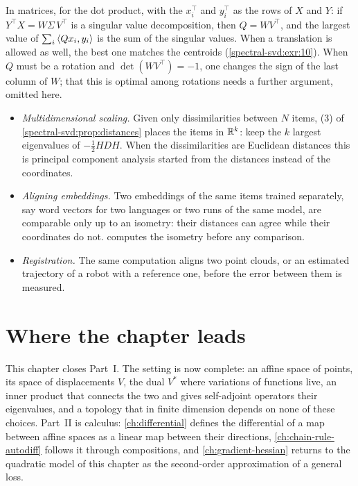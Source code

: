 \begin{notechapter}
In matrices, for the dot product, with the $x_i^\top$ and $y_i^\top$ as
the rows of $X$ and
$Y$: if $Y^\top X = W\Sigma\,V^\top$ is a singular value decomposition,
then $Q = WV^\top$, and the largest value of
$\sum_i\left\langle Qx_i, y_i \right\rangle$ is the sum of the singular values. When a
translation is allowed as well, the best one matches the centroids
(\cref{spectral-svd:exr:10}). When $Q$ must be a rotation and
$\det(WV^\top) = -1$, one changes the sign of the last column of $W$;
that this is optimal among rotations needs a further argument, omitted
here.

\begin{mlthread}
\begin{itemize}[nosep]
  \item \emph{Multidimensional scaling.} Given only dissimilarities
        between $N$ items, (3) of
        \cref{spectral-svd:prop:distances} places the items in $\mathbb{R}^k$:
        keep the $k$ largest eigenvalues of $-\frac12HDH$. When the
        dissimilarities are Euclidean distances this is principal
        component analysis started from the distances instead of the
        coordinates.
  \item \emph{Aligning embeddings.} Two embeddings of the same items
        trained separately, say word vectors for two languages or two
        runs of the same model, are comparable only up to an
        isometry: their distances can agree while their coordinates
        do not.  computes the
        isometry before any comparison.
  \item \emph{Registration.} The same computation aligns two point
        clouds, or an estimated trajectory of a robot with a reference
        one, before the error between them is measured.
\end{itemize}
\end{mlthread}

\section{Where the chapter leads}\label{spectral-svd:sec:outlook}

This chapter closes Part~I. The setting is now complete: an affine space
of points, its space of displacements $V$, the dual $V^*$ where
variations of functions live, an inner product that connects the two and
gives self-adjoint operators their eigenvalues, and a topology that in
finite dimension depends on none of these choices. Part~II is calculus:
\cref{ch:differential} defines the differential of a map between affine
spaces as a linear map between their directions,
\cref{ch:chain-rule-autodiff} follows it through compositions, and
\cref{ch:gradient-hessian} returns to the quadratic model of this chapter
as the second-order approximation of a general loss.


\end{notechapter}
